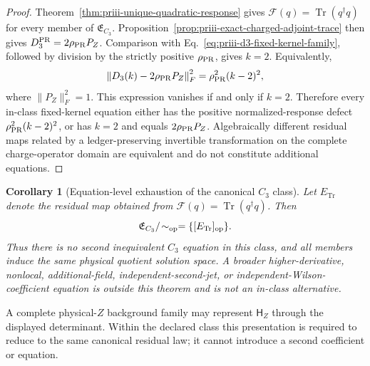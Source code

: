 \documentclass[11pt]{article}
\newtheorem{corollary}[theorem]{Corollary}
\begin{document}
\begin{proof}
Theorem~\ref{thm:priii-unique-quadratic-response} gives
$\mathcal F(q)=\operatorname{Tr}(q^\dagger q)$ for every member of
$\mathfrak E_{C_3}$.  Proposition~\ref{prop:priii-exact-charged-adjoint-trace}
then gives \(D_3^{\rm PR}=2\rho_{\rm PR}P_Z\).  Comparison with
Eq.~\eqref{eq:priii-d3-fixed-kernel-family}, followed by division by the strictly positive
\(\rho_{\rm PR}\), gives \(k=2\).  Equivalently,
\begin{equation}
\left\|D_3(k)-2\rho_{\rm PR}P_Z\right\|_{F}^{2}
=
\rho_{\rm PR}^{2}(k-2)^2,
\end{equation}
where \(\|P_Z\|_F^2=1\).  This expression vanishes if and only if \(k=2\).
Therefore every in-class fixed-kernel equation either has the positive
normalized-response defect $\rho_{\rm PR}^2(k-2)^2$, or has \(k=2\) and equals
\(2\rho_{\rm PR}P_Z\).  Algebraically different residual maps related by a
ledger-preserving invertible transformation on the complete charge-operator
domain are equivalent and do not constitute additional equations.
\end{proof}

\begin{corollary}[Equation-level exhaustion of the canonical \(C_3\) class]
\label{cor:priii-c3-equation-exhaustion}
Let $E_{\operatorname{Tr}}$ denote the residual map obtained from
$\mathcal F(q)=\operatorname{Tr}(q^\dagger q)$.  Then
\begin{equation}
 \mathfrak E_{C_3}/\!\sim_{\rm op}
 =\{[E_{\operatorname{Tr}}]_{\rm op}\}.
 \label{eq:priii-c3-equation-singleton}
\end{equation}
Thus there is no second inequivalent \(C_3\) equation in this class, and all
members induce the same physical quotient solution space.  A broader
higher-derivative, nonlocal, additional-field, independent-second-jet, or
independent-Wilson-coefficient equation is outside this theorem and is not an
in-class alternative.
\end{corollary}

A complete physical-$Z$ background family may represent $\mathsf H_Z$ through
the displayed determinant.  Within the declared class this presentation is
required to reduce to the same canonical residual law; it cannot introduce a
second coefficient or equation.
\end{document}
